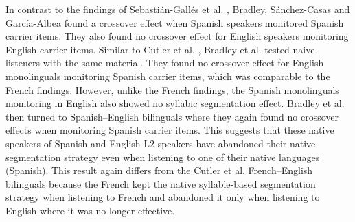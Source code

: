 \documentclass[
12pt, %
english, %
doublespacing, %
nolistspacing, %
liststotoc, %
headsepline, %
chapterinoneline, %
openany, %
]{DoctoralThesis}\usepackage[]{graphicx}\usepackage[]{color}
\begin{document}
In contrast to the findings of Sebastián-Gallés et al. \parencite*{Sebastian-Galles1992-xd} , Bradley, Sánchez-Casas and García-Albea \parencite*{Bradley1993-qq}  found a crossover effect when Spanish speakers monitored Spanish carrier items. They also found no crossover effect for English speakers monitoring English carrier items. Similar to Cutler et al. \parencite*{Cutler1986-zl}, Bradley et al. \parencite*{Bradley1993-qq}  tested naive listeners with the same material. They found no crossover effect for English monolinguals monitoring Spanish carrier items, which was comparable to the French findings. However, unlike the French findings, the Spanish monolinguals monitoring in English also showed no syllabic segmentation effect. Bradley et al. \parencite*{Bradley1993-qq} then turned to Spanish–English bilinguals where they again found no crossover effects when monitoring Spanish carrier items. This suggests that these native speakers of Spanish and English L2 speakers have abandoned their native segmentation strategy even when listening to one of their native languages (Spanish). This result again differs from the Cutler et al. \parencite*{Cutler1986-zl} French–English bilinguals because the French kept the native syllable-based segmentation strategy when listening to French and abandoned it only when listening to English where it was no longer effective.



\end{document}
